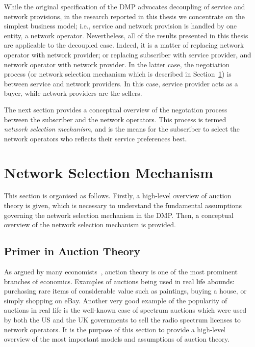 While the original specification of the DMP advocates decoupling of service and network provisions, in the research reported in this thesis we concentrate on the simplest business model; i.e., service and network provision is handled by one entity, a network operator. Nevertheless, all of the results presented in this thesis are applicable to the decoupled case. Indeed, it is a matter of replacing network operator with network provider; or replacing subscriber with service provider, and network operator with network provider. In the latter case, the negotiation process (or network selection mechanism which is described in Section~\ref{sec:network_selection_mechanism_dmp}) is between service and network providers. In this case, service provider acts as a buyer, while network providers are the sellers.

The next section provides a conceptual overview of the negotation process between the subscriber and the network operators. This process is termed \emph{network selection mechanism}, and is the means for the subscriber to select the network operators who reflects their service preferences best.

\section{Network Selection Mechanism} %
\label{sec:network_selection_mechanism_dmp}
This section is organised as follows. Firstly, a high-level overview of auction theory is given, which is necessary to understand the fundamental assumptions governing the network selection mechanism in the DMP. Then, a conceptual overview of the network selection mechanism is provided.

\subsection{Primer in Auction Theory} %
\label{sub:primer_in_auction_theory_dmp}
As argued by many economists~\cite{Klemperer1999,Milgrom2004,Krishna10}, auction theory is one of the most prominent branches of economics. Examples of auctions being used in real life abounds: purchasing rare items of considerable value such as paintings, buying a house, or simply shopping on eBay. Another very good example of the popularity of auctions in real life is the well-known case of spectrum auctions which were used by both the US and the UK governments to sell the radio spectrum licenses to network operators. It is the purpose of this section to provide a high-level overview of the most important models and assumptions of auction theory.

